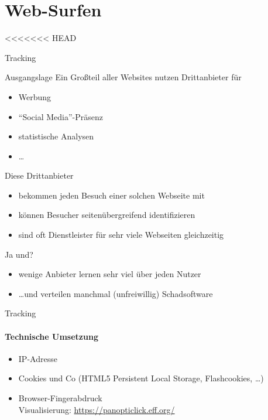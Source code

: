 \section{Web-Surfen}
<<<<<<< HEAD
\begin{frame}{Tracking}
  \begin{block}{Ausgangslage}
    Ein Großteil aller Websites nutzen Drittanbieter für
    \begin{itemize}
      \item Werbung
      \item ``Social Media''-Präsenz
      \item statistische Analysen
      \item \ldots
    \end{itemize}
  \end{block}

    \pause
    Diese Drittanbieter
    \begin{itemize}
      \item bekommen jeden Besuch einer solchen Webseite mit
      \pause
      \item können Besucher seitenübergreifend identifizieren
      \pause
      \item sind oft Dienstleister für sehr viele Webseiten gleichzeitig
    \end{itemize}
    \pause
    Ja und?
    \pause
    \begin{itemize}
      \item wenige Anbieter lernen sehr viel über jeden Nutzer
      \pause
      \item \ldots und verteilen manchmal (unfreiwillig) Schadsoftware
    \end{itemize}
  \end{frame}
  \begin{frame}{Tracking}
  \framesubtitle{Technische Umsetzung}
  \begin{itemize}
    \item IP-Adresse
    \item Cookies und Co (HTML5 Persistent Local Storage, Flashcookies, \ldots)
    \item Browser-Fingerabdruck\\
      \scriptsize Visualisierung: \url{https://panopticlick.eff.org/} \normalsize
  \end{itemize}
\end{frame}

